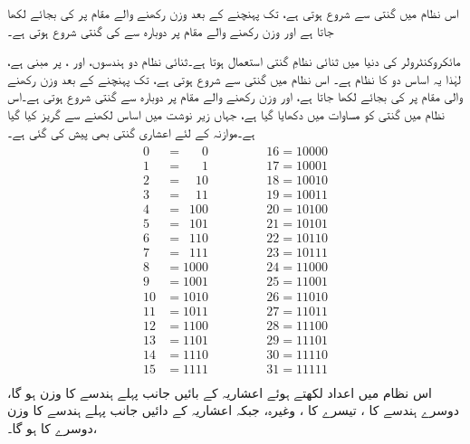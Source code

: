 	اس نظام میں گنتی  سے شروع ہوتی ہے،  تک پہنچنے کے بعد  وزن رکھنے والے مقام پر  کی بجائے  لکھا جاتا ہے اور  وزن رکھنے والے مقام پر دوبارہ سے  کی گنتی شروع ہوتی ہے۔

	مائکروکنٹرولر کی دنیا میں ثنائی نظامِ گنتی استعمال ہوتا ہے۔ثنائی نظام دو ہندسوں،  اور ، پر مبنی ہے، لہٰذا یہ اساس دو کا نظام ہے۔
	اس نظام میں گنتی  سے شروع ہوتی ہے،  تک پہنچنے کے بعد  وزن رکھنے والی مقام پر  کی بجائے  لکھا جاتا ہے، اور  وزن رکھنے والے مقام پر دوبارہ  سے  گنتی شروع ہوتی ہے۔اس نظام میں گنتی کو مساوات  میں دکھایا گیا ہے، جہاں زیر نوشت میں اساس لکھنے سے گریز کیا گیا ہے۔موازنہ کے لئے اعشاری گنتی بھی پیش کی گئی ہے۔
\begin{gather}
\begin{aligned}\label{مساوات_ثنائی_گنتی}
0&=\phantom{000}0 &\quad \quad \quad &16=10000\\
1&=\phantom{000}1 &\quad \quad \quad &17=10001\\
2&=\phantom{00}10 &\quad \quad \quad &18=10010\\
3&=\phantom{00}11 &\quad \quad \quad &19=10011\\
4&=\phantom{0}100 &\quad \quad \quad &20=10100\\
5&=\phantom{0}101 &\quad \quad \quad &21=10101\\
6&=\phantom{0}110 &\quad \quad \quad &22=10110\\
7&=\phantom{0}111 &\quad \quad \quad &23=10111\\
8&=1000 &\quad \quad \quad &24=11000\\
9&=1001 &\quad \quad \quad &25=11001\\
10&=1010 &\quad \quad \quad &26=11010\\
11&=1011 &\quad \quad \quad &27=11011\\
12&=1100 &\quad \quad \quad &28=11100\\
13&=1101 &\quad \quad \quad &29=11101\\
14&=1110 &\quad \quad \quad &30=11110\\
15&=1111 &\quad \quad \quad &31=11111\\
\end{aligned}
\end{gather}
	اس نظام میں اعداد لکھتے ہوئے اعشاریہ کے بائیں جانب پہلے ہندسے کا وزن  ہو گا، دوسرے ہندسے کا  ، تیسرے کا ، وغیرہ، جبکہ اعشاریہ کے دائیں جانب پہلے ہندسے کا وزن  ،دوسرے کا  ہو گا۔
	
